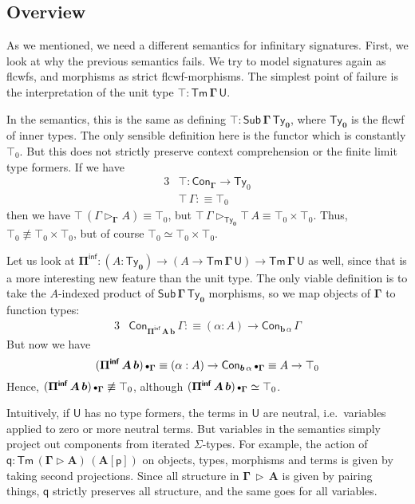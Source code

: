 \documentclass[12pt,a4paper,twoside,openany]{book}
\theoremstyle{remark}
\theoremstyle{definition}
\theoremstyle{theorem}
\newcommand{\bs}[1]{\boldsymbol{#1}}
\newcommand{\Con}{\mathsf{Con}}
\newcommand{\Sub}{\mathsf{Sub}}
\newcommand{\Tm}{\mathsf{Tm}}
\newcommand{\Ty}{\mathsf{Ty}}
\newcommand{\U}{\mathsf{U}}
\newcommand{\ext}{\triangleright}
\newcommand{\emptycon}{\scaleobj{.75}\bullet}
\newcommand{\Piinf}{\Pi^{\mathsf{inf}}}
\newcommand{\p}{\mathsf{p}}
\newcommand{\q}{\mathsf{q}}
\newcommand{\bGamma}{\bs{\Gamma}}
\newcommand{\bb}{\bs{b}}
\newcommand{\bU}{\bs{\U}}
\newcommand{\defn}{:\equiv}
\begin{document}
\subsection{Overview}

As we mentioned, we need a different semantics for infinitary signatures.
First, we look at why the previous semantics fails. We try to model signatures
again as flcwfs, and morphisms as strict flcwf-morphisms. The simplest point of
failure is the interpretation of the unit type $\bs{\top : \Tm\,\Gamma\,\U}$.

In the semantics, this is the same as defining $\bs{\top :
  \Sub\,\Gamma\,\Ty_0}$, where $\bs{\Ty_0}$ is the flcwf of inner types. The
only sensible definition here is the functor which is constantly $\top_0$. But
this does not strictly preserve context comprehension or the finite limit type formers.
If we have
\begin{alignat*}{3}
  &\bs{\top} : \Con_{\bGamma} \to \Ty_0\\
  &\bs{\top}\,\Gamma \defn \top_0
\end{alignat*}
then we have $\bs{\top}\,(\Gamma \ext_{\bGamma} A) \equiv \top_0$, but
$\bs{\top}\,\Gamma \ext_{\bs{\Ty_0}} \bs{\top}\,A \equiv \top_0 \times \top_0$.
Thus, $\top_0 \not\equiv \top_0 \times \top_0$, but of course $\top_0 \simeq
\top_0 \times \top_0$.

Let us look at $\bs{\Piinf} : (A : \bs{\Ty_0}) \to (A \to \bs{\Tm\,\Gamma\,\U}) \to
\bs{\Tm\,\Gamma\,\U}$ as well, since that is a more interesting new feature than the
unit type. The only viable definition is to take the $A$-indexed product of
$\bs{\Sub\,\Gamma\,\Ty_0}$ morphisms, so we map objects of $\bGamma$ to function types:
\begin{alignat*}{3}
  &\Con_{\bs{\Piinf\,A\,b}}\,\Gamma \defn (\alpha : A) \to \Con_{\bb\,\alpha}\,\Gamma
\end{alignat*}
But now we have
\[(\bs{\Piinf\,A\,b})\,\emptycon_{\bGamma} \equiv (\alpha : A) \to \Con_{\bb\,\alpha}\,\emptycon_{\bGamma}
   \equiv A \to \top_0\]
Hence, $(\bs{\Piinf\,A\,b})\,\emptycon_{\bGamma} \not\equiv \top_0$, although
$(\bs{\Piinf\,A\,b})\,\emptycon_{\bGamma} \simeq \top_0$.

Intuitively, if $\bU$ has no type formers, the terms in $\bU$ are neutral,
i.e.\ variables applied to zero or more neutral terms. But variables in the
semantics simply project out components from iterated $\Sigma$-types. For
example, the action of $\bs{\q} : \bs{\Tm\,(\Gamma \ext A)\,(A[\p])}$ on
objects, types, morphisms and terms is given by taking second
projections. Since all structure in $\bs{\Gamma\,\ext\,A}$ is given by pairing
things, $\bs{\q}$ strictly preserves all structure, and the same goes
for all variables.
\end{document}
